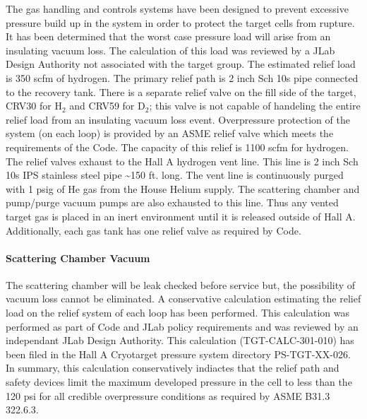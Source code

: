 \begin{safetyen}{0}{0}
The gas handling and controls systems have been designed to prevent
excessive pressure build up in the system in order to protect the
target cells from rupture. It has been determined that the worst case
pressure load will arise from an insulating vacuum loss. The calculation
of this load was reviewed by a JLab Design Authority not associated
with the target group. The estimated relief load is 350 scfm of hydrogen.
The primary relief path is 2 inch Sch 10s pipe connected to the recovery
tank. There is a separate relief valve on the fill side of the target,
CRV30 for H$_{2}$ and CRV59 for D$_{2}$; this valve is not capable
of handeling the entire relief load from an insulating vacuum loss
event. Overpressure protection of the system (on each loop) is provided
by an ASME relief valve which meets the requirements of the Code.
The capacity of this relief is 1100 scfm for hydrogen. The relief
valves exhaust to the Hall A hydrogen vent line. This line is 2 inch
Sch 10s IPS stainless steel pipe \textasciitilde{}150 ft. long. The
vent line is continuously purged with 1 psig of He gas from the House
Helium supply. The scattering chamber and pump/purge vacuum pumps
are also exhausted to this line. Thus any vented target gas is placed
in an inert environment until it is released outside of Hall A. Additionally,
each gas tank has one relief valve as required by Code.


\paragraph{Scattering Chamber Vacuum}

\label{sec:cryo_targ_cmb_falure}

The scattering chamber will be leak checked before service but, the
possibility of vacuum loss cannot be eliminated. A conservative calculation
estimating the relief load on the relief system of each loop has been
performed. This calculation was performed as part of Code and JLab
policy requirements and was reviewed by an independant JLab Design
Authority. This calculation (TGT-CALC-301-010) has been filed in the
Hall A Cryotarget pressure system directory PS-TGT-XX-026. In summary,
this calculation conservatively indiactes that the relief path and
safety devices limit the maximum developed pressure in the cell to
less than the 120 psi for all credible overpressure conditions as
required by ASME B31.3 322.6.3.


\end{safetyen}
